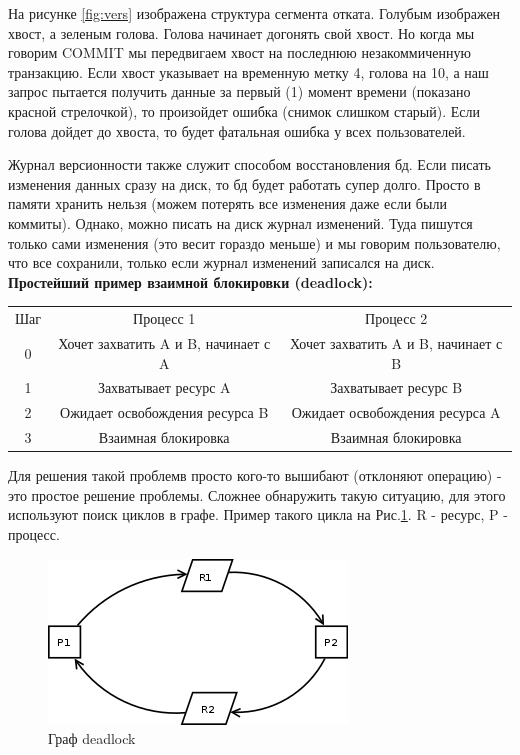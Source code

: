 На рисунке \ref{fig:vers} изображена структура сегмента отката. Голубым изображен хвост, а зеленым голова. Голова начинает догонять свой хвост. Но когда мы говорим COMMIT мы передвигаем хвост на последнюю незакоммиченную транзакцию. Если хвост указывает на временную метку 4, голова на 10, а наш запрос пытается получить данные за первый (1) момент времени (показано красной стрелочкой), то произойдет ошибка (снимок слишком старый). Если голова дойдет до хвоста, то будет фатальная ошибка у всех пользователей. 


Журнал версионности также служит способом восстановления бд. Если писать изменения данных сразу на диск, то бд будет работать супер долго. Просто в памяти хранить нельзя (можем потерять все изменения даже если были коммиты). Однако, можно писать на диск журнал изменений. Туда пишутся только сами изменения (это весит гораздо меньше) и мы говорим пользователю, что все сохранили, только если журнал изменений записался на диск. 
\\[20pt]
\textbf{Простейший пример взаимной блокировки (deadlock):}

\begin{center}
	\begin{tabular}{c|c | c}
		Шаг	& Процесс 1	& Процесс 2 \\
		0	&Хочет захватить A и B, начинает с A &	Хочет захватить A и B, начинает с B \\
		1&	Захватывает ресурс A &	Захватывает ресурс B \\
		2&	Ожидает освобождения ресурса B	& Ожидает освобождения ресурса A \\
		3	&Взаимная блокировка & Взаимная блокировка
	\end{tabular}
\end{center}

Для решения такой проблемв просто кого-то вышибают (отклоняют операцию) - это простое решение проблемы. Сложнее обнаружить такую ситуацию, для этого используют поиск циклов в графе. Пример такого цикла на Рис.\ref{fig:dead}. R - ресурс, P - процесс. 

\begin{figure}[H]
	\centering
	\includegraphics[scale = 0.5]{6/deadlock.png}
	\caption{Граф deadlock}
	\label{fig:dead}
	
\end{figure}
